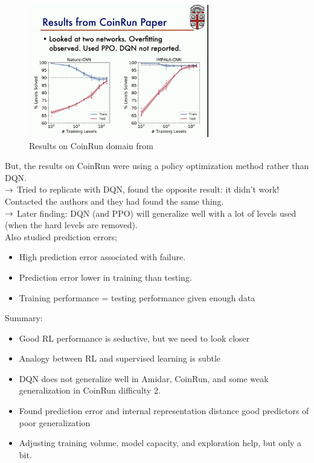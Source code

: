 \begin{figure}[h!]
    \centering
    \includegraphics[width=0.7\textwidth]{figures/coin_run.png}
    \caption{Results on CoinRun domain from \citet{cobbe2018quantifying}}
    \label{fig:coinrun}
\end{figure}


But, the results on CoinRun were using a policy optimization method rather than DQN. \\

$\rightarrow$ Tried to replicate with DQN, found the opposite result: it didn't work! Contacted the authors and they had found the same thing. \\

$\rightarrow$ Later finding: DQN (and PPO) will generalize well with a lot of levels used (when the hard levels are removed). \\

Also studied prediction errors;
\begin{itemize}
    \item High prediction error associated with failure.
    \item Prediction error lower in training than testing.
    \item Training performance = testing performance  given enough data
\end{itemize}

Summary:
\begin{itemize}
    \item Good RL performance is seductive, but we need to look closer
    
    \item Analogy between RL and supervised learning is subtle
    \item DQN does not generalize well in Amidar, CoinRun, and some weak generalization in CoinRun difficulty 2.
    \item Found prediction error and internal representation 
    distance good predictors of poor generalization
    
    \item Adjusting training volume, model capacity, and exploration help, but only a bit.
\end{itemize}

\spacerule